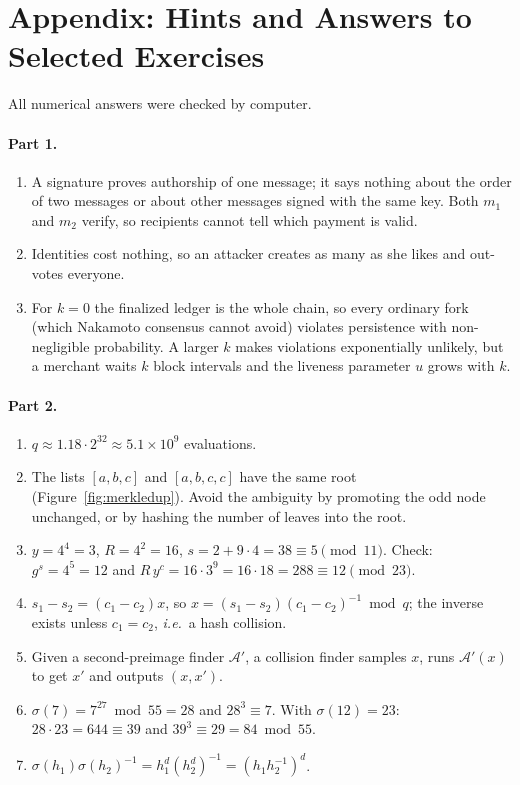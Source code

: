 \documentclass[11pt,a4paper]{article}
\theoremstyle{definition}
\theoremstyle{plain}
\theoremstyle{remark}
\newcommand{\Adv}{\mathcal{A}}
\newcommand{\ie}{\textit{i.e.}}
\begin{document}
\newpage
\section*{Appendix: Hints and Answers to Selected Exercises}
\small
All numerical answers were checked by computer.

\paragraph{Part 1.}
\begin{enumerate}[nosep,leftmargin=1.5em]
\item A signature proves authorship of one message; it says nothing about the order of two messages or about other messages signed with the same key. Both $m_1$ and $m_2$ verify, so recipients cannot tell which payment is valid.
\item Identities cost nothing, so an attacker creates as many as she likes and out-votes everyone.
\item For $k=0$ the finalized ledger is the whole chain, so every ordinary fork (which Nakamoto consensus cannot avoid) violates persistence with non-negligible probability. A larger $k$ makes violations exponentially unlikely, but a merchant waits $k$ block intervals and the liveness parameter $u$ grows with $k$.
\end{enumerate}

\paragraph{Part 2.}
\begin{enumerate}[nosep,leftmargin=1.5em]
\item $q\approx1.18\cdot2^{32}\approx5.1\times10^{9}$ evaluations.
\item The lists $[a,b,c]$ and $[a,b,c,c]$ have the same root (Figure~\ref{fig:merkledup}). Avoid the ambiguity by promoting the odd node unchanged, or by hashing the number of leaves into the root.
\item $y=4^4=3$, $R=4^2=16$, $s=2+9\cdot4=38\equiv5\pmod{11}$. Check: $g^s=4^5=12$ and $R\,y^c=16\cdot3^9=16\cdot18=288\equiv12\pmod{23}$.
\item $s_1-s_2=(c_1-c_2)x$, so $x=(s_1-s_2)(c_1-c_2)^{-1}\bmod q$; the inverse exists unless $c_1=c_2$, \ie\ a hash collision.
\item Given a second-preimage finder $\Adv'$, a collision finder samples $x$, runs $\Adv'(x)$ to get $x'$ and outputs $(x,x')$.
\item $\sigma(7)=7^{27}\bmod55=28$ and $28^3\equiv7$. With $\sigma(12)=23$: $28\cdot23=644\equiv39$ and $39^3\equiv29=84\bmod55$.
\item $\sigma(h_1)\sigma(h_2)^{-1}=h_1^d(h_2^{d})^{-1}=(h_1h_2^{-1})^d$.
\end{enumerate}
\end{document}
